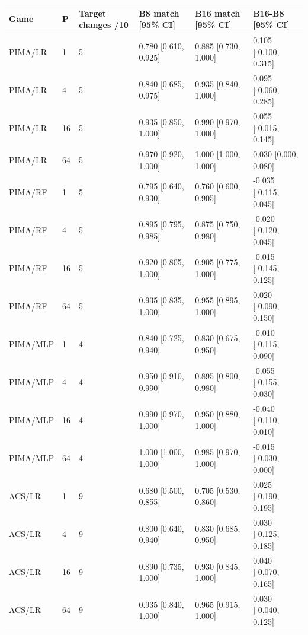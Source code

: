 \begingroup\footnotesize\setlength{\tabcolsep}{3pt}
\begin{tabular}{llllll}
\toprule
Game & P & Target changes /10 & B8 match [95\% CI] & B16 match [95\% CI] & B16-B8 [95\% CI] \\
\midrule
PIMA/LR & 1 & 5 & 0.780 [0.610, 0.925] & 0.885 [0.730, 1.000] & 0.105 [-0.100, 0.315] \\
PIMA/LR & 4 & 5 & 0.840 [0.685, 0.975] & 0.935 [0.840, 1.000] & 0.095 [-0.060, 0.285] \\
PIMA/LR & 16 & 5 & 0.935 [0.850, 1.000] & 0.990 [0.970, 1.000] & 0.055 [-0.015, 0.145] \\
PIMA/LR & 64 & 5 & 0.970 [0.920, 1.000] & 1.000 [1.000, 1.000] & 0.030 [0.000, 0.080] \\
PIMA/RF & 1 & 5 & 0.795 [0.640, 0.930] & 0.760 [0.600, 0.905] & -0.035 [-0.115, 0.045] \\
PIMA/RF & 4 & 5 & 0.895 [0.795, 0.985] & 0.875 [0.750, 0.980] & -0.020 [-0.120, 0.045] \\
PIMA/RF & 16 & 5 & 0.920 [0.805, 1.000] & 0.905 [0.775, 1.000] & -0.015 [-0.145, 0.125] \\
PIMA/RF & 64 & 5 & 0.935 [0.835, 1.000] & 0.955 [0.895, 1.000] & 0.020 [-0.090, 0.150] \\
PIMA/MLP & 1 & 4 & 0.840 [0.725, 0.940] & 0.830 [0.675, 0.950] & -0.010 [-0.115, 0.090] \\
PIMA/MLP & 4 & 4 & 0.950 [0.910, 0.990] & 0.895 [0.800, 0.980] & -0.055 [-0.155, 0.030] \\
PIMA/MLP & 16 & 4 & 0.990 [0.970, 1.000] & 0.950 [0.880, 1.000] & -0.040 [-0.110, 0.010] \\
PIMA/MLP & 64 & 4 & 1.000 [1.000, 1.000] & 0.985 [0.970, 1.000] & -0.015 [-0.030, 0.000] \\
ACS/LR & 1 & 9 & 0.680 [0.500, 0.855] & 0.705 [0.530, 0.860] & 0.025 [-0.190, 0.195] \\
ACS/LR & 4 & 9 & 0.800 [0.640, 0.940] & 0.830 [0.685, 0.950] & 0.030 [-0.125, 0.185] \\
ACS/LR & 16 & 9 & 0.890 [0.735, 1.000] & 0.930 [0.845, 1.000] & 0.040 [-0.070, 0.165] \\
ACS/LR & 64 & 9 & 0.935 [0.840, 1.000] & 0.965 [0.915, 1.000] & 0.030 [-0.040, 0.125] \\

\end{tabular}
